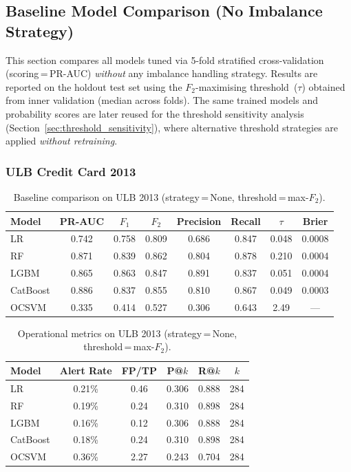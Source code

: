 \subsection{Baseline Model Comparison (No Imbalance Strategy)}
\label{sec:baseline_results}

This section compares all models tuned via 5-fold stratified cross-validation
(scoring\,=\,PR-AUC) \emph{without} any imbalance handling strategy.
Results are reported on the holdout test set using the
$F_2$-maximising threshold~($\tau$) obtained from inner validation
(median across folds).
The same trained models and probability scores are later reused for
the threshold sensitivity analysis (Section~\ref{sec:threshold_sensitivity}),
where alternative threshold strategies are applied \emph{without retraining}.


\subsubsection{ULB Credit Card 2013}

\begin{table}[ht]
\centering
\caption{Baseline comparison on ULB 2013 (strategy\,=\,None, threshold\,=\,max-$F_2$).}
\label{tab:baseline_ulb}
\begin{tabular}{l c c c c c c c}
\toprule
Model & PR-AUC & $F_1$ & $F_2$ & Precision & Recall & $\tau$ & Brier \\
\midrule
LR         & 0.742 & 0.758 & 0.809 & 0.686 & 0.847 & 0.048 & 0.0008 \\
RF         & 0.871 & 0.839 & 0.862 & 0.804 & 0.878 & 0.210 & 0.0004 \\
LGBM       & 0.865 & 0.863 & 0.847 & 0.891 & 0.837 & 0.051 & 0.0004 \\
CatBoost   & 0.886 & 0.837 & 0.855 & 0.810 & 0.867 & 0.049 & 0.0003 \\
OCSVM      & 0.335 & 0.414 & 0.527 & 0.306 & 0.643 & 2.49 & --- \\
\bottomrule
\end{tabular}
\end{table}

\begin{table}[ht]
\centering
\caption{Operational metrics on ULB 2013 (strategy\,=\,None, threshold\,=\,max-$F_2$).}
\label{tab:ops_ulb}
\begin{tabular}{l c c c c c}
\toprule
Model & Alert Rate & FP/TP & P@$k$ & R@$k$ & $k$ \\
\midrule
LR         & 0.21\% & 0.46 & 0.306 & 0.888 & 284 \\
RF         & 0.19\% & 0.24 & 0.310 & 0.898 & 284 \\
LGBM       & 0.16\% & 0.12 & 0.306 & 0.888 & 284 \\
CatBoost   & 0.18\% & 0.24 & 0.310 & 0.898 & 284 \\
OCSVM      & 0.36\% & 2.27 & 0.243 & 0.704 & 284 \\
\bottomrule
\end{tabular}
\end{table}

